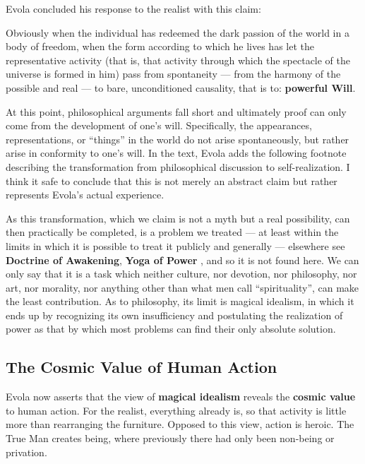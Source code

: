 Evola concluded his response to the realist with this claim:

\begin{quotex}
Obviously when the individual has redeemed the dark passion of the world in a body of freedom, when the form according to which he lives has let the representative activity (that is, that activity through which the spectacle of the universe is formed in him) pass from spontaneity --- from the harmony of the possible and real --- to bare, unconditioned causality, that is to: \textbf{powerful Will}.
\end{quotex}


At this point, philosophical arguments fall short and ultimately proof can only come from the development of one's will. Specifically, the appearances, representations, or ``things'' in the world do not arise spontaneously, but rather arise in conformity to one's will. In the text, Evola adds the following footnote describing the transformation from philosophical discussion to self-realization. I think it safe to conclude that this is not merely an abstract claim but rather represents Evola's actual experience.

\begin{quotex}
As this transformation, which we claim is not a myth but a real possibility, can then practically be completed, is a problem we treated --- at least within the limits in which it is possible to treat it publicly and generally --- elsewhere see \textbf{Doctrine of Awakening}, \textbf{Yoga of Power} , and so it is not found here. We can only say that it is a task which neither culture, nor devotion, nor philosophy, nor art, nor morality, nor anything other than what men call ``spirituality'', can make the least contribution. As to philosophy, its limit is magical idealism, in which it ends up by recognizing its own insufficiency and postulating the realization of power as that by which most problems can find their only absolute solution.
\end{quotex}


\subsection*{The Cosmic Value of Human Action}

Evola now asserts that the view of \textbf{magical idealism} reveals the \textbf{cosmic value} to human action. For the realist, everything already is, so that activity is little more than rearranging the furniture. Opposed to this view, action is heroic. The True Man creates being, where previously there had only been non-being or privation.

